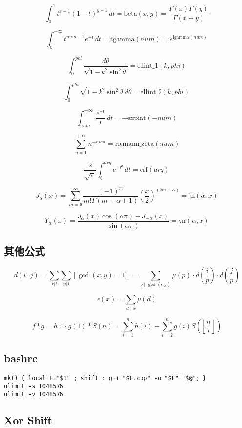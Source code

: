 \documentclass[a4paper,landscape,twocolumn]{ctexart}
\begin{document}
{
\Large
$$ \int_0^1 t^{x-1}(1-t)^{y-1}\,dt = \mathrm{beta}(x,y) = \frac{\Gamma(x)\Gamma(y)}{\Gamma(x+y)} $$

$$ \int_0^{+\infty} t^{num-1}e^{-t}\,dt = \mathrm{tgamma}(num) = e^{\mathrm{lgamma}(num)}$$

$$ \int_0^{phi} \frac{d\theta}{\sqrt{1-k^2\sin^2\theta}} = \mathrm{ellint\_1}(k,phi) $$

$$ \int_0^{phi} \sqrt{1-k^2\sin^2\theta}\,d\theta = \mathrm{ellint\_2}(k,phi) $$

$$ \int_{num}^{+\infty} \frac{e^{-t}}{t}\,dt = -\mathrm{expint}(-num) $$

$$ \sum_{n=1}^{+\infty} n^{-num} = \mathrm{riemann\_zeta}(num) $$

$$ \frac{2}{\sqrt{\pi}}\int_0^{arg} e^{-t^2}\,dt = \mathrm{erf}(arg) $$

$$ J_{\alpha} (x) = \sum_{m = 0}^{\infty} \frac{(-1)^m}{m ! \Gamma (m + \alpha + 1)} \left(\frac{x}{2}\right) ^ {(2 m + \alpha)} = \mathrm{jn} (\alpha, x) $$

$$ Y_{\alpha} (x) = \frac{J_{\alpha} (x) \cos (\alpha \pi) - J_{ - \alpha} (x)}{\sin (\alpha \pi)} = \mathrm{yn} (\alpha, x) $$

}

\subsection{其他公式}

{
\Large
$$ d(i \cdot j) = \sum_{x | i} \sum_{y | j} [\gcd (x, y) = 1] = \sum_{p \mid \gcd (i, j)} \mu (p) \cdot d (\frac{i}{p}) \cdot d (\frac{j}{p}) $$

$$ \epsilon (x) = \sum \limits_{d \mid x} \mu (d) $$
}

$$
f * g = h \iff g(1) * S(n) = \sum_{i = 1}^{n} h(i) - \sum_{i = 2}^{n} g(i) S(\left \lfloor \frac{n}{i} \right \rfloor)
$$

\subsection{bashrc}

\begin{lstlisting}
mk() { local F="$1" ; shift ; g++ "$F.cpp" -o "$F" "$@"; }
ulimit -s 1048576
ulimit -v 1048576
\end{lstlisting}

\subsection{Xor \space Shift}
\end{document}
